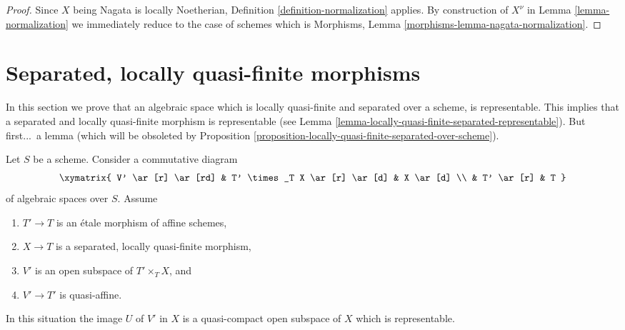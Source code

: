 \begin{proof}
Since $X$ being Nagata is locally Noetherian,
Definition \ref{definition-normalization} applies.
By construction of $X^\nu$ in Lemma \ref{lemma-normalization}
we immediately reduce to the case of schemes which is
Morphisms, Lemma \ref{morphisms-lemma-nagata-normalization}.
\end{proof}












\section{Separated, locally quasi-finite morphisms}
\label{section-schemehood}

\noindent
In this section we prove that an algebraic space which is locally
quasi-finite and separated over a scheme, is representable. This
implies that a separated and locally quasi-finite morphism is
representable (see
Lemma \ref{lemma-locally-quasi-finite-separated-representable}).
But first...\ a lemma (which will be obsoleted by
Proposition \ref{proposition-locally-quasi-finite-separated-over-scheme}).

\begin{lemma}
\label{lemma-neighbourhood-scheme}
Let $S$ be a scheme. Consider a commutative diagram
$$
\xymatrix{
V' \ar[r] \ar[rd] & T' \times_T X \ar[r] \ar[d] & X \ar[d] \\
& T' \ar[r] & T
}
$$
of algebraic spaces over $S$. Assume
\begin{enumerate}
\item $T' \to T$ is an \'etale morphism of affine schemes,
\item $X \to T$ is a separated, locally quasi-finite morphism,
\item $V'$ is an open subspace of $T' \times_T X$, and
\item $V' \to T'$ is quasi-affine.
\end{enumerate}
In this situation the image $U$ of $V'$ in $X$ is a quasi-compact
open subspace of $X$ which is representable.
\end{lemma}

